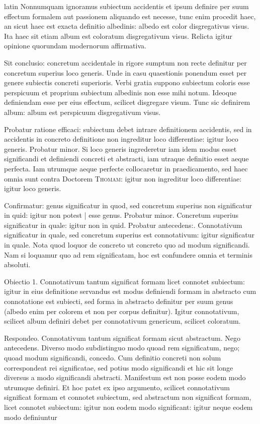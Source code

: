 \begin{otherlanguage*}{latin}
\pstart
Nonnumquam ignoramus subiectum accidentis et ipsum definire per suum effectum formalem aut passionem aliquando est necesse, tunc  enim procedit haec, an sicut haec est exacta definitio albedinis:
albedo est color disgregativus visus. Ita haec sit etiam album est coloratum disgregativum visus. Relicta igitur opinione quorundam modernorum affirmativa. 
\pend

\pstart
Sit conclusio:
concretum accidentale in rigore sumptum non recte definitur per concretum superius loco generis. Unde in casu quaestionis ponendum esset per genere subiectis concreti superioris. Verbi gratia suppono subiectum coloris esse perspicuum et proprium subiectum albedinis non esse mihi notum. Ideoque definiendam esse per eius effectum, scilicet disgregare visum. Tunc sic definirem album:
album est perspicuum disgregativum visus. 
\pend

\pstart
Probatur ratione efficaci:
subiectum debet intrare definitionem accidentis, sed in accidentis in concreto definitione non ingreditur loco differentiae:
igitur loco generis. Probatur minor. Si loco generis ingrederetur iam idem modus esset significandi et definiendi concreti et abstracti, iam utraque definitio esset aeque perfecta. Iam utrumque aeque perfecte collocaretur in praedicamento, sed haec omnia sunt contra Doctorem \textsc{Thomam}:
igitur non ingreditur loco differentiae:
igitur loco generis. 
\pend

\pstart
Confirmatur:
genus significatur in quod, sed concretum superius non significatur in quid:
igitur non potest \textnormal{|} esse genus. Probatur minor. Concretum superius significatur in quale:
igitur non in quid. Probatur antecedens:. Connotativum significatur in quale, sed concretum superius est connotativum:
igitur significatur in quale. Nota quod loquor de concreto ut concreto quo ad modum significandi. Nam si loquamur quo ad rem significatam, hoc est confundere omnia et terminis absoluti. 
\pend

\pstart
Obiectio 1. Connotativum tantum significat formam licet connotet subiectum:
igitur in eius definitione servandus est modus definiendi formam in abstracto cum connotatione est subiecti, sed forma in abstracto definitur per suum genus (albedo enim per colorem et non per corpus definitur). Igitur connotativum, scilicet album definiri debet per connotativum genericum, scilicet coloratum. 
\pend

\pstart
Respondeo. Connotativum tantum significat formam sicut abstractum. Nego antecedens. Diverso modo subdistinguo modo quoad rem significatum, nego; quoad modum significandi, concedo. Cum definitio concreti non solum correspondeat rei significatae, sed potius modo significandi et hic sit longe diversus a modo significandi abstracti. Manifestum est non posse eodem modo utrumque definiri. Et hoc patet ex ipso argumento, scilicet connotativum significat formam et connotet subiectum, sed abstractum non significat formam, licet connotet subiectum:
igitur non eodem modo significant:
igitur neque eodem modo definiuntur 
\pend


\end{otherlanguage*}
